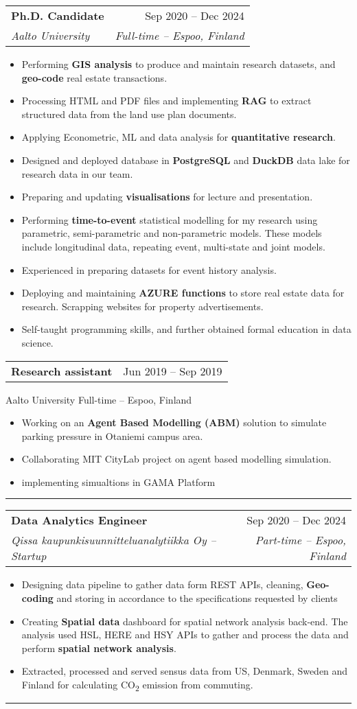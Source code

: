 \documentclass[a4paper,11pt]{article}
\makeatletter
\newcommand{\resumeItem}[1]{
	\item\small{#1}
}
\newcommand{\resumeItemListStart}{\begin{itemize}[rightmargin=0.11in]}
\newcommand{\resumeItemListEnd}{\end{itemize}}
\newcommand{\resumeQuadHeading}[4]{
	\item
	\begin{tabular*}{0.96\textwidth}[t]{l@{\extracolsep{\fill}}r}
		\textbf{#1} & #2 \\
		\textit{\small#3} & \textit{\small #4} \\
	\end{tabular*}
}
\newcommand{\resumeQuadHeadingChild}[2]{
	\item
	\begin{tabular*}{0.96\textwidth}[t]{l@{\extracolsep{\fill}}r}
		\textbf{\small#1} & {\small#2} \\
	\end{tabular*}
}
\makeatother
\begin{document}
	\resumeQuadHeading{Ph.D. Candidate}{Sep 2020 -- Dec 2024}
	{Aalto University}  {Full-time -- Espoo, Finland}
	\resumeItemListStart{}
	\resumeItem{Performing \textbf{GIS analysis} to produce and maintain research datasets, and \textbf{geo-code} real estate transactions.}
	\resumeItem{Processing HTML and PDF files and implementing \textbf{RAG} to extract structured data from the land use plan documents.}
	\resumeItem{Applying Econometric, ML and data analysis for \textbf{quantitative research}.}
	\resumeItem{Designed and deployed database in \textbf{PostgreSQL} and \textbf{DuckDB} data lake for research data in our team.}
	\resumeItem{Preparing and updating \textbf{visualisations} for lecture and presentation.}
	\resumeItem{Performing \textbf{time-to-event} statistical modelling for my research using parametric, semi-parametric and non-parametric models. These models include longitudinal data, repeating event, multi-state and joint models.}
	\resumeItem{Experienced in preparing datasets for event history analysis.}
	\resumeItem{Deploying and maintaining \textbf{AZURE functions} to store real estate data for research. Scrapping websites for property advertisements.}
	\resumeItem{Self-taught programming skills, and further obtained formal education in data science.}
	\resumeItemListEnd{}
	
	\resumeQuadHeadingChild{Research assistant} {Jun 2019 -- Sep 2019}
	{Aalto University}  {Full-time -- Espoo, Finland}
	\resumeItemListStart{}
	\resumeItem{Working on an \textbf{Agent Based Modelling (ABM)} solution to simulate parking pressure in Otaniemi campus area.}
	\resumeItem{Collaborating MIT CityLab project on agent based modelling simulation.}
	\resumeItem{implementing simualtions in GAMA Platform}
	\resumeItemListEnd{}
	\noindent\rule{0.5\linewidth}{0.4pt}


	\resumeQuadHeading{Data Analytics Engineer}{Sep 2020 -- Dec 2024}
	{Qissa kaupunkisuunnitteluanalytiikka Oy -- Startup}  {Part-time -- Espoo, Finland}
	\resumeItemListStart{}
	\resumeItem{Designing data pipeline to gather data form REST APIs, cleaning, \textbf{Geo-coding} and storing in accordance to the specifications requested by clients}
	\resumeItem{Creating \textbf{Spatial data} dashboard for spatial network analysis back-end. The analysis used HSL, HERE and HSY APIs to gather and process the data and perform \textbf{spatial network analysis}.}
	\resumeItem{Extracted, processed and served sensus data from US, Denmark, Sweden and Finland for calculating CO\textsubscript{2} emission from commuting.}
	\resumeItemListEnd{}
	\noindent\rule{0.5\linewidth}{0.4pt}
	
\end{document}
